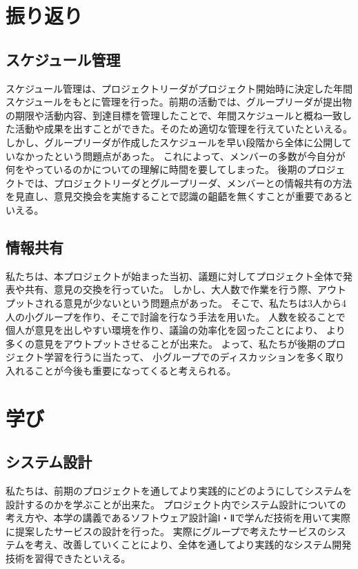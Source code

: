 \documentclass[11pt,papersize]{jsbook}
\begin{document}
\section{振り返り}

\subsection{スケジュール管理}
スケジュール管理は、プロジェクトリーダがプロジェクト開始時に決定した年間スケジュールをもとに管理を行った。前期の活動では、グループリーダが提出物の期限や活動内容、到達目標を管理したことで、年間スケジュールと概ね一致した活動や成果を出すことができた。そのため適切な管理を行えていたといえる。
しかし、グループリーダが作成したスケジュールを早い段階から全体に公開していなかったという問題点があった。
これによって、メンバーの多数が今自分が何をやっているのかについての理解に時間を要してしまった。
後期のプロジェクトでは、プロジェクトリーダとグループリーダ、メンバーとの情報共有の方法を見直し、意見交換会を実施することで認識の齟齬を無くすことが重要であるといえる。

\subsection{情報共有}
私たちは、本プロジェクトが始まった当初、議題に対してプロジェクト全体で発表や共有、意見の交換を行っていた。
しかし、大人数で作業を行う際、アウトプットされる意見が少ないという問題点があった。
そこで、私たちは3人から4人の小グループを作り、そこで討論を行なう手法を用いた。
人数を絞ることで個人が意見を出しやすい環境を作り、議論の効率化を図ったことにより、
より多くの意見をアウトプットさせることが出来た。
よって、私たちが後期のプロジェクト学習を行うに当たって、
小グループでのディスカッションを多く取り入れることが今後も重要になってくると考えられる。

\section{学び}

\subsection{システム設計}
私たちは、前期のプロジェクトを通してより実践的にどのようにしてシステムを設計するのかを学ぶことが出来た。
プロジェクト内でシステム設計についての考え方や、本学の講義であるソフトウェア設計論Ⅰ・Ⅱで学んだ技術を用いて実際に提案したサービスの設計を行った。
実際にグループで考えたサービスのシステムを考え、改善していくことにより、全体を通してより実践的なシステム開発技術を習得できたといえる。
\end{document}

